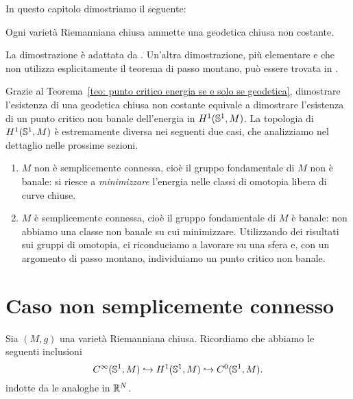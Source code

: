 
In questo capitolo dimostriamo il seguente:
\begin{teo}\label{teo: Lusternik-Fet}
	Ogni varietà Riemanniana chiusa ammette una geodetica chiusa non costante. 
\end{teo}
La dimostrazione è adattata da \cite[Theorem~2.4.20]{klingenberg1995riemannian}. Un'altra dimostrazione, più elementare e che non utilizza esplicitamente il teorema di passo montano, può essere trovata in \cite[Theorem~A.1.5]{klingenberg2012lectures}.

Grazie al Teorema~\ref{teo: punto critico energia se e solo se geodetica}, dimostrare l'esistenza di una geodetica chiusa non costante equivale a dimostrare l'esistenza di un punto critico non banale dell'energia in \(H^1(\mathbb{S}^1,M)\). La topologia di \(H^1(\mathbb{S}^1,M)\) è estremamente diversa nei seguenti due casi, che analizziamo nel dettaglio nelle prossime sezioni.
\begin{enumerate}[label=(\arabic*)]
	\item \(M\) non è semplicemente connessa, cioè il gruppo fondamentale di \(M\) non è banale: si riesce a \textit{minimizzare} l'energia nelle classi di omotopia libera di curve chiuse.
	\item  \(M\) è semplicemente connessa, cioè il gruppo fondamentale di \(M\) è banale: non abbiamo una classe non banale su cui minimizzare. Utilizzando dei risultati sui gruppi di omotopia, ci riconduciamo a lavorare su una sfera e, con un argomento di passo montano, individuiamo un punto critico non banale. 
\end{enumerate}

\section{Caso non semplicemente connesso}\label{sez: non semplicemente connesso}

Sia \((M,g)\) una varietà Riemanniana chiusa. Ricordiamo che abbiamo le seguenti inclusioni
\[
	C^\infty(\mathbb{S}^1,M) \hookrightarrow H^1(\mathbb{S}^1,M) \hookrightarrow C^0(\mathbb{S}^1,M).
\]
indotte da le analoghe in \(\mathbb{R}^N\).

